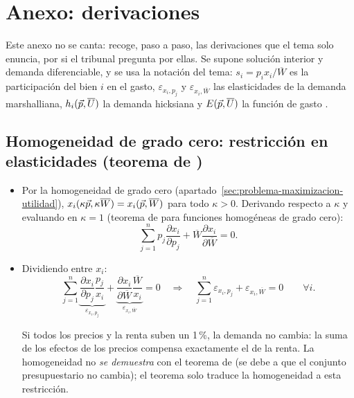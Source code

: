 \documentclass[11pt]{article}
\begin{document}
\section{Anexo: derivaciones}\label{anexo:derivaciones}

\begin{notaopositor}
Este anexo no se canta: recoge, paso a paso, las derivaciones que el tema solo enuncia, por si el tribunal pregunta por ellas. Se supone solución interior y demanda diferenciable, y se usa la notación del tema: $s_i=p_ix_i/\overline{W}$ es la participación del bien $i$ en el gasto, $\varepsilon_{x_i,p_j}$ y $\varepsilon_{x_i,\overline{W}}$ las elasticidades de la demanda marshalliana, $h_i(\vec{p},\overline{U})$ la demanda hicksiana y $E(\vec{p},\overline{U})$ la función de gasto .
\end{notaopositor}

\subsection{Homogeneidad de grado cero:\cortetitulo{} restricción en elasticidades (teorema de )}\label{der:homogeneidad}

\begin{itemize}
\item Por la homogeneidad de grado cero (apartado~\ref{sec:problema-maximizacion-utilidad}), $x_i(\kappa\vec{p},\kappa\overline{W})=x_i(\vec{p},\overline{W})$ para todo $\kappa>0$. Derivando respecto a $\kappa$ y evaluando en $\kappa=1$ (teorema de  para funciones homogéneas de grado cero):
  \begin{equation*}
  \sum_{j=1}^{n}p_j\frac{\partial x_i}{\partial p_j}+\overline{W}\frac{\partial x_i}{\partial\overline{W}}=0.
  \end{equation*}
\item Dividiendo entre $x_i$:
  \begin{equation*}
  \sum_{j=1}^{n}\underbrace{\frac{\partial x_i}{\partial p_j}\frac{p_j}{x_i}}_{\varepsilon_{x_i,p_j}}+\underbrace{\frac{\partial x_i}{\partial\overline{W}}\frac{\overline{W}}{x_i}}_{\varepsilon_{x_i,\overline{W}}}=0\quad\Longrightarrow\quad\sum_{j=1}^{n}\varepsilon_{x_i,p_j}+\varepsilon_{x_i,\overline{W}}=0\qquad\forall i.
  \end{equation*}
  \findemo

  Si todos los precios y la renta suben un 1\,\%, la demanda no cambia: la suma de los efectos de los precios compensa exactamente el de la renta. La homogeneidad no \emph{se demuestra} con el teorema de  (se debe a que el conjunto presupuestario no cambia); el teorema solo traduce la homogeneidad a esta restricción.
\end{itemize}
\end{document}
